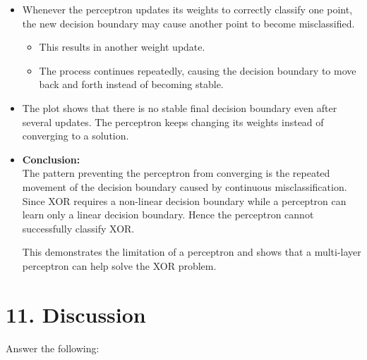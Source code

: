 \documentclass[11pt]{article}
\begin{document}
\begin{itemize}[itemsep=0.25cm]
    \item Whenever the perceptron updates its weights to correctly classify one point, 
    the new decision boundary may cause another point to become misclassified.
    \begin{itemize}
        \item This results in another weight update.
        \item The process continues repeatedly, causing the decision boundary to 
        move back and forth instead of becoming stable.
    \end{itemize}

    \item The plot shows that there is no stable final decision boundary 
    even after several updates. The perceptron keeps changing its weights instead 
    of converging to a solution.

    \item \textbf{Conclusion:}\\
    The pattern preventing the perceptron from converging is 
    the repeated movement of the decision boundary caused by continuous 
    misclassification. Since XOR requires a non-linear decision boundary
    while a perceptron can learn only a linear decision boundary. Hence the perceptron 
    cannot successfully classify XOR.

    This demonstrates the limitation of a perceptron and shows that a multi-layer perceptron can help solve the XOR problem.

\end{itemize}
\section*{11. Discussion}

Answer the following:
\end{document}
